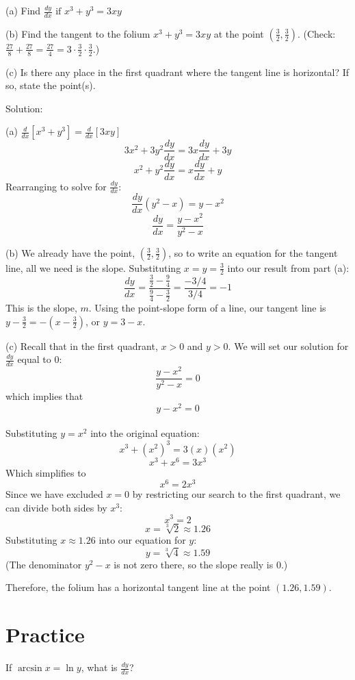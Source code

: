 (a) Find $\frac{dy}{dx} \text{ if } x^3+y^3 = 3xy$

(b) Find the tangent to the folium $x^3+y^3=3xy$ at the point $(\frac{3}{2}, \frac{3}{2})$. (Check: $\frac{27}{8} + \frac{27}{8} = \frac{27}{4} = 3 \cdot \frac{3}{2} \cdot \frac{3}{2}$.)

(c) Is there any place in the first quadrant where the tangent line 
is horizontal? If so, state the point(s). 

Solution:

(a) $\frac{d}{dx}[x^3+y^3]=\frac{d}{dx}[3xy]$
$$3x^2+3y^2\frac{dy}{dx}=3x\frac{dy}{dx}+3y$$
$$x^2+y^2\frac{dy}{dx}=x\frac{dy}{dx}+y$$
Rearranging to solve for $\frac{dy}{dx}$:
$$\frac{dy}{dx}(y^2-x)=y-x^2$$
$$\frac{dy}{dx}=\frac{y-x^2}{y^2-x}$$

(b) We already have the point, $(\frac{3}{2}, \frac{3}{2})$, so to write an 
equation for the tangent line, all we need is the slope. Substituting 
$x = y = \frac{3}{2}$ into our result from part (a):
$$\frac{dy}{dx}=\frac{\frac{3}{2}-\frac{9}{4}}{\frac{9}{4}-\frac{3}{2}}=\frac{-3/4}{3/4}=-1$$
This is the slope, $m$. Using the point-slope form of a line, our 
tangent line is $y-\frac{3}{2}=-\left(x-\frac{3}{2}\right)$, or $y = 3 - x$. 

(c) Recall that in the first quadrant, $x > 0$ and $y > 0$. We will 
set our solution for $\frac{dy}{dx}$  equal to 0:
$$\frac{y-x^2}{y^2-x} = 0$$
which implies that $$y - x^2 = 0$$ \\
Substituting $y = x^2$ into the original equation: 
$$x^3 + (x^2)^3 = 3(x)(x^2)$$ 
$$x^3 + x^6 = 3x^3$$
Which simplifies to 
$$x^6 = 2x^3$$
Since we have excluded $x = 0$ by restricting our search to the first 
quadrant, we can divide both sides by $x^3$: 
$$x^3 = 2$$ 
$$x = \sqrt[3]{2} \approx 1.26$$
Substituting $x \approx 1.26$ into our equation for $y$: 
$$y = \sqrt[3]{4} \approx 1.59$$
(The denominator $y^2 - x$ is not zero there, so the slope really is 0.)

Therefore, the folium has a horizontal tangent line at the point 
$(1.26, 1.59)$.

\section{Practice}
\begin{Exercise} If 
	$\arcsin{x} = \ln{y}$, what is $\frac{dy}{dx}$?
\end{Exercise}

